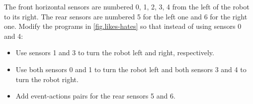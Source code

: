 
 { The front horizontal sensors are numbered
0, 1, 2, 3, 4 from the left of the robot to its right. The rear sensors
are numbered 5 for the left one and 6 for the right one. Modify the
programs in \cref{fig.likes-hates} so that instead of
using sensors 0 and 4:
\begin{itemize}[noitemsep,nosep,leftmargin=*]
\item Use sensors 1 and 3 to turn the robot left and right, respectively.
\item Use both sensors 0 and 1 to turn the robot left and both sensors 3
and 4 to turn the robot right.
\item Add event-actions pairs for the rear sensors 5 and 6.
\end{itemize}
}

\bigskip


\bigskip


